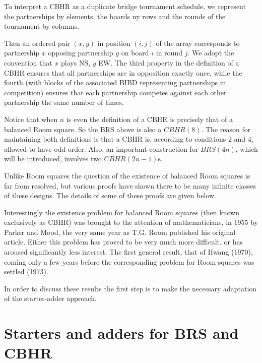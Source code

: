 \documentclass[
  12pt,
  a4paper]{book}
\begin{document}
To interpret a CBHR as a duplicate bridge tournament schedule, we
represent the partnerships by elements, the boards ny rows and the
rounds of the tournament by columns.

Then an ordered pair \((x,y)\) in position \((i,j)\) of the array
corresponds to partnership \(x\) opposing partnership \(y\) on board \(i\) in
round \(j\). We adopt the convention that \(x\) plays NS, \(y\) EW. The third
property in the definition of a CBHR ensures that all partnerships are
in opposition exactly once, while the fourth (with blocks of the
associated BIBD representing partnerships in competition) ensures that
each partnership competes against each other partnership the same number
of times.

Notice that when \(n\) is even the definition of a CBHR is precisely that
of a balanced Room square. So the BRS above is also a \(CBHR(8)\). The
reason for maintaining both definitions is that a CBHR is, according to
conditions 2 and 4, allowed to have odd order. Also, an important
construction for \(BRS(4n)\), which will be introduced, involves two
\(CBHR(2n-1)\)s.

Unlike Room squares the question of the existence of balanced Room
squares is far from resolved, but various proofs have shown there to be
many infinite classes of these designs. The details of some of these
proofs are given below.

Interestingly the existence problem for balanced Room squares (then
known exclusively as CBHR) was brought to the attention of
mathematicians, in 1955 by Parker and Mood, the very same year as T.G.
Room published his original article. Either this problem has proved to
be very much more difficult, or has aroused significantly less interest.
The first general result, that of Hwang (1970), coming only a few years
before the corresponding problem for Room squares was settled (1973).

In order to discuss these results the first step is to make the
necessary adaptation of the starter-adder approach.

\hypertarget{starters-and-adders-for-brs-and-cbhr}{%
\section{Starters and adders for BRS and CBHR}\label{starters-and-adders-for-brs-and-cbhr}}
\end{document}

